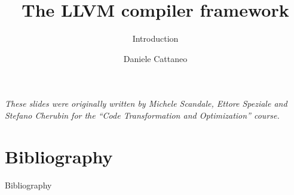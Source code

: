

\author{Daniele Cattaneo}
\date{\DATE}
\title{The LLVM compiler framework}
\subtitle{Introduction}
\newcommand{\customdata}{Daniele Cattaneo <daniele.cattaneo@polimi.it>}





\begin{frame}
\maketitle
\begin{center}
\itshape\scriptsize
These slides were originally written by
Michele Scandale, Ettore Speziale and Stefano Cherubin for the
``Code Transformation and Optimization'' course.
\end{center}
\end{frame}










\section{Bibliography}
\begin{frame}[allowframebreaks]{Bibliography}
\nocite{*}


\end{frame}



